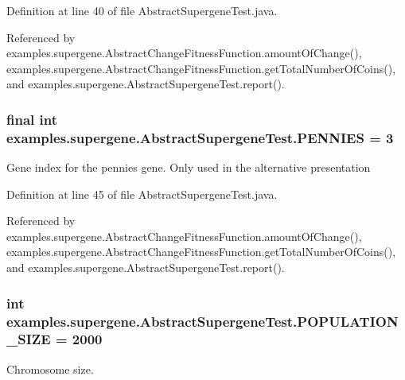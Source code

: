 Definition at line 40 of file Abstract\-Supergene\-Test.\-java.



Referenced by examples.\-supergene.\-Abstract\-Change\-Fitness\-Function.\-amount\-Of\-Change(), examples.\-supergene.\-Abstract\-Change\-Fitness\-Function.\-get\-Total\-Number\-Of\-Coins(), and examples.\-supergene.\-Abstract\-Supergene\-Test.\-report().

\hypertarget{classexamples_1_1supergene_1_1_abstract_supergene_test_a0853afd453197d0e7db44388752d12af}{
\subsubsection[{P\-E\-N\-N\-I\-E\-S}]{\setlength{\rightskip}{0pt plus 5cm}final int examples.\-supergene.\-Abstract\-Supergene\-Test.\-P\-E\-N\-N\-I\-E\-S = 3\hspace{0.3cm}{\ttfamily [static]}}}\label{classexamples_1_1supergene_1_1_abstract_supergene_test_a0853afd453197d0e7db44388752d12af}
Gene index for the pennies gene. Only used in the alternative presentation 

Definition at line 45 of file Abstract\-Supergene\-Test.\-java.



Referenced by examples.\-supergene.\-Abstract\-Change\-Fitness\-Function.\-amount\-Of\-Change(), examples.\-supergene.\-Abstract\-Change\-Fitness\-Function.\-get\-Total\-Number\-Of\-Coins(), and examples.\-supergene.\-Abstract\-Supergene\-Test.\-report().

\hypertarget{classexamples_1_1supergene_1_1_abstract_supergene_test_af5010d4eddc24d9723d539ea6c12c595}{
\subsubsection[{P\-O\-P\-U\-L\-A\-T\-I\-O\-N\-\_\-\-S\-I\-Z\-E}]{\setlength{\rightskip}{0pt plus 5cm}int examples.\-supergene.\-Abstract\-Supergene\-Test.\-P\-O\-P\-U\-L\-A\-T\-I\-O\-N\-\_\-\-S\-I\-Z\-E = 2000\hspace{0.3cm}{\ttfamily [static]}}}\label{classexamples_1_1supergene_1_1_abstract_supergene_test_af5010d4eddc24d9723d539ea6c12c595}
Chromosome size. 

